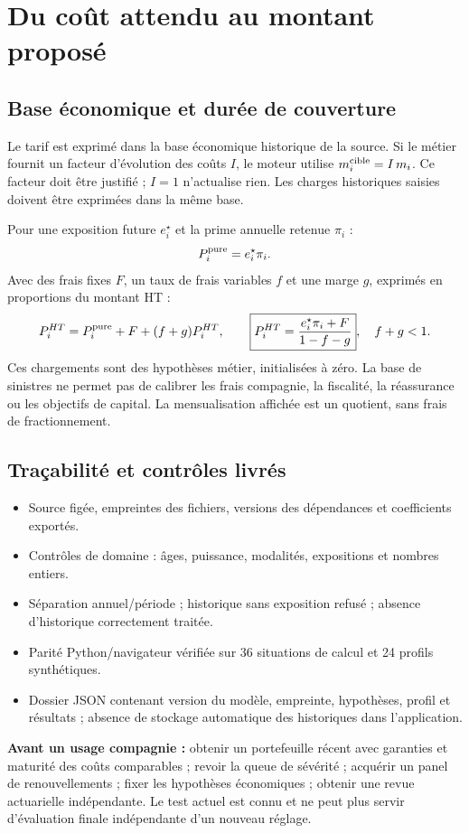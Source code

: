 \documentclass[11pt,a4paper]{article}
\begin{document}
\section{Du coût attendu au montant proposé}
\subsection*{Base économique et durée de couverture}
Le tarif est exprimé dans la base économique historique de la source. Si le métier fournit un facteur d'évolution des coûts $I$, le moteur utilise $m_i^{\rm cible}=I\,m_i$. Ce facteur doit être justifié ; $I=1$ n'actualise rien. Les charges historiques saisies doivent être exprimées dans la même base.

Pour une exposition future $e_i^\star$ et la prime annuelle retenue $\pi_i$ :
\[
P_i^{\rm pure}=e_i^\star\pi_i.
\]
Avec des frais fixes $F$, un taux de frais variables $f$ et une marge $g$, exprimés en proportions du montant HT :
\[
P_i^{HT}=P_i^{\rm pure}+F+(f+g)P_i^{HT},\qquad
\boxed{P_i^{HT}=\frac{e_i^\star\pi_i+F}{1-f-g}},\quad f+g<1.
\]
Ces chargements sont des hypothèses métier, initialisées à zéro. La base de sinistres ne permet pas de calibrer les frais compagnie, la fiscalité, la réassurance ou les objectifs de capital. La mensualisation affichée est un quotient, sans frais de fractionnement.

\subsection*{Traçabilité et contrôles livrés}
\begin{itemize}
\item Source figée, empreintes des fichiers, versions des dépendances et coefficients exportés.
\item Contrôles de domaine : âges, puissance, modalités, expositions et nombres entiers.
\item Séparation annuel/période ; historique sans exposition refusé ; absence d'historique correctement traitée.
\item Parité Python/navigateur vérifiée sur 36 situations de calcul et 24 profils synthétiques.
\item Dossier JSON contenant version du modèle, empreinte, hypothèses, profil et résultats ; absence de stockage automatique des historiques dans l'application.
\end{itemize}

\begin{limitbox}
\textbf{Avant un usage compagnie :} obtenir un portefeuille récent avec garanties et maturité des coûts comparables ; revoir la queue de sévérité ; acquérir un panel de renouvellements ; fixer les hypothèses économiques ; obtenir une revue actuarielle indépendante. Le test actuel est connu et ne peut plus servir d'évaluation finale indépendante d'un nouveau réglage.
\end{limitbox}
\end{document}
